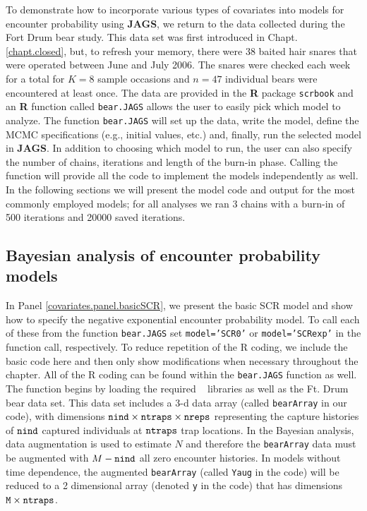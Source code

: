 To demonstrate how to incorporate various types of covariates into
models for encounter probability using {\bf JAGS}, we return to the
data collected during the Fort Drum bear study.  This data set was first
introduced in Chapt. \ref{chapt.closed}, but, to refresh your memory,
there were 38 baited hair snares that were operated between June and
July 2006.  The snares were checked each week for a total for $K=8$
sample occasions and $n=47$ individual bears were encountered at least
once.  The data are provided in the {\bf R} package \mbox{\tt scrbook}
and an {\bf R} function called {\tt bear.JAGS} allows the user to
easily pick which model to analyze.  The function {\tt bear.JAGS} will
set up the data, write the model, define the MCMC specifications
(e.g., initial values, etc.) and, finally, run the selected model in
{\bf JAGS}. In addition to choosing which model to run, the user can
also specify the number of chains, iterations and length of the
burn-in phase. Calling the function will provide all the code to
implement the models independently as well.  In the following sections
we will present the model code and output for the most commonly
employed models; for all analyses we ran 3 chains with a burn-in of
500 iterations and 20000 saved iterations.

\subsection{Bayesian analysis of encounter probability models}

In Panel \ref{covariates.panel.basicSCR}, we present the basic SCR
model and show how to specify the negative exponential encounter
probability model.
  To call each of these from the function {\tt bear.JAGS} set
{\tt model='SCR0'} or {\tt model='SCRexp'} in the function call,
respectively.  To reduce repetition of the R coding, we include the
basic code here and then only show modifications when necessary throughout
the chapter.  All of the R coding can be found within the {\tt bear.JAGS}
function as well.   The function begins by loading the required \R~ 
libraries as well as the Ft. Drum bear data set.  This data set includes 
a 3-d data array (called \mbox{\tt bearArray} in our code), 
with dimensions $\mbox{\tt nind} \times \mbox{\tt ntraps} \times \mbox{\tt nreps}$ 
representing the capture histories of $\mbox{\tt nind}$ captured individuals at
$\mbox{\tt ntraps}$ trap locations.  In the Bayesian analysis, data augmentation is
used to estimate $N$ and therefore the \mbox{\tt bearArray} data must be augmented with
$M - \mbox{\tt nind}$ all zero encounter histories.  In models without time dependence,
the augmented \mbox{\tt bearArray} (called \mbox{\tt Yaug} in the code) will be reduced
to a 2 dimensional array (denoted \mbox{\tt y} in the code) that has dimensions 
 $\mbox{\tt M} \times \mbox{\tt ntraps}$.

